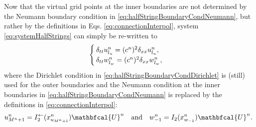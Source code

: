 Now that the virtual grid points at the inner boundaries are not determined by the Neumann boundary condition in \eqref{eq:halfStringBoundaryCondNeumann}, but rather by the definitions in Eqs. \eqref{eq:connectionInterpol}, system \eqref{eq:systemHalfStrings} can simply be re-written to
\begin{equation}\label{eq:FDSwithMethod}
    \begin{cases}
        \delta_{tt}u_{l_u}^n = (c^n)^2\delta_{xx}u_{l_u}^n,\\
        \delta_{tt}w_{l_w}^n = (c^n)^2\delta_{xx}w_{l_w}^n,
    \end{cases}
\end{equation}
where the Dirichlet condition in \eqref{eq:halfStringBoundaryCondDirichlet} is (still) used for the outer boundaries and the Neumann condition at the inner boundaries in \eqref{eq:halfStringBoundaryCondNeumann} is replaced by the definitions in \eqref{eq:connectionInterpol}:
\begin{equation}
        \!\!u_{M^n+1}^n = I_2^\flip(x_{u_{M^n+1}}^n)\mathbfcal{U}^n \quad \text{and}\quad w_{-1}^n = I_2(x_{w_{-1}}^n)\mathbfcal{U}^n.
\end{equation}

